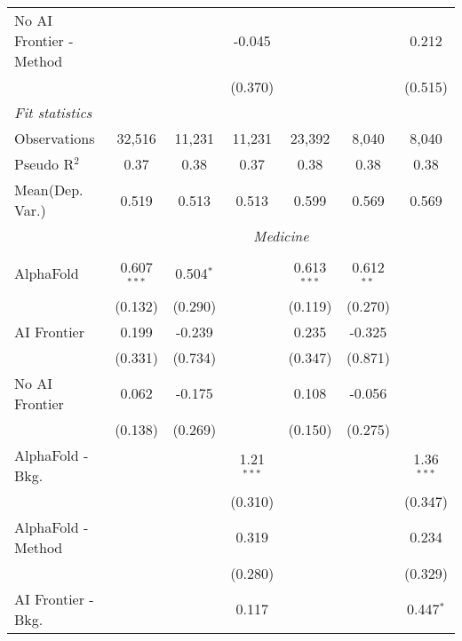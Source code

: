 \begin{tabular}{lcccccc}
   No AI Frontier - Method &               &                & -0.045        &               &              & 0.212\\   
                           &               &                & (0.370)       &               &              & (0.515)\\   
   \midrule
   \emph{Fit statistics}\\
   Observations            & 32,516        & 11,231         & 11,231        & 23,392        & 8,040        & 8,040\\  
   Pseudo R$^2$            & 0.37          & 0.38           & 0.37          & 0.38          & 0.38         & 0.38\\  
   
Mean(Dep. Var.) & 0.519 & 0.513 & 0.513 & 0.599 & 0.569 & 0.569 \\
 & \multicolumn{6}{c}{\textit{Medicine}} \\ \\
   AlphaFold               & 0.607$^{***}$ & 0.504$^{*}$ &              & 0.613$^{***}$ & 0.612$^{**}$ &   \\   
                           & (0.132)       & (0.290)     &              & (0.119)       & (0.270)      &   \\   
   AI Frontier             & 0.199         & -0.239      &              & 0.235         & -0.325       &   \\   
                           & (0.331)       & (0.734)     &              & (0.347)       & (0.871)      &   \\   
   No AI Frontier          & 0.062         & -0.175      &              & 0.108         & -0.056       &   \\   
                           & (0.138)       & (0.269)     &              & (0.150)       & (0.275)      &   \\   
   AlphaFold - Bkg.        &               &             & 1.21$^{***}$ &               &              & 1.36$^{***}$\\   
                           &               &             & (0.310)      &               &              & (0.347)\\   
   AlphaFold - Method      &               &             & 0.319        &               &              & 0.234\\   
                           &               &             & (0.280)      &               &              & (0.329)\\   
   AI Frontier - Bkg.      &               &             & 0.117        &               &              & 0.447$^{*}$\\   

\end{tabular}

